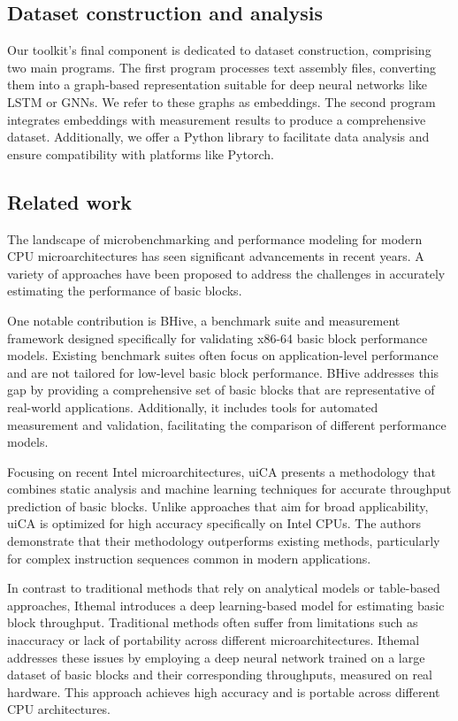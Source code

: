 \subsection{Dataset construction and analysis}

Our toolkit's final component is dedicated to dataset construction, comprising two main programs. The first program processes text assembly files, converting them into a graph-based representation suitable for deep neural networks like LSTM or GNNs. We refer to these graphs as embeddings. The second program integrates embeddings with measurement results to produce a comprehensive dataset. Additionally, we offer a Python library to facilitate data analysis and ensure compatibility with platforms like Pytorch.

\subsection{Related work}

The landscape of microbenchmarking and performance modeling for modern CPU microarchitectures has seen significant advancements in recent years. A variety of approaches have been proposed to address the challenges in accurately estimating the performance of basic blocks.

One notable contribution is BHive, a benchmark suite and measurement framework designed specifically for validating x86-64 basic block performance models\cite{chenBHiveBenchmarkSuite2019}. Existing benchmark suites often focus on application-level performance and are not tailored for low-level basic block performance. BHive addresses this gap by providing a comprehensive set of basic blocks that are representative of real-world applications. Additionally, it includes tools for automated measurement and validation, facilitating the comparison of different performance models.

Focusing on recent Intel microarchitectures, uiCA presents a methodology that combines static analysis and machine learning techniques for accurate throughput prediction of basic blocks\cite{abelUiCAAccurateThroughput2022}. Unlike approaches that aim for broad applicability, uiCA is optimized for high accuracy specifically on Intel CPUs. The authors demonstrate that their methodology outperforms existing methods, particularly for complex instruction sequences common in modern applications.

In contrast to traditional methods that rely on analytical models or table-based approaches, Ithemal introduces a deep learning-based model for estimating basic block throughput. Traditional methods often suffer from limitations such as inaccuracy or lack of portability across different microarchitectures. Ithemal addresses these issues by employing a deep neural network trained on a large dataset of basic blocks and their corresponding throughputs, measured on real hardware. This approach achieves high accuracy and is portable across different CPU architectures.

